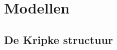 \documentclass{article}
\begin{document}
	
	\section{Modellen}
	
	\subsection{De Kripke structuur}
	
\end{document}
